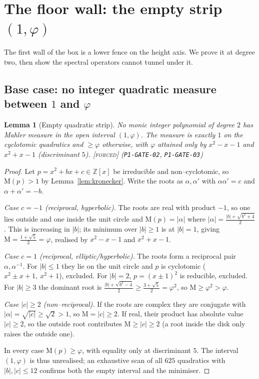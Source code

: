 \documentclass[11pt]{article}
\theoremstyle{plain}
\newtheorem{lemma}[theorem]{Lemma}
\theoremstyle{definition}
\theoremstyle{remark}
\newcommand{\forced}{\textcolor{forcedc}{\textsc{[forced]}}}
\newcommand{\Z}{\mathbb{Z}}
\newcommand{\Mah}{\mathrm{M}}
\newcommand{\abs}[1]{\left\lvert #1 \right\rvert}
\begin{document}
\section{The floor wall: the empty strip \texorpdfstring{$(1,\varphi)$}{(1,phi)}}\label{sec:floor}

The first wall of the box is a lower fence on the height axis. We prove it at degree two, then show the spectral operators cannot tunnel under it.

\subsection{Base case: no integer quadratic measure between \texorpdfstring{$1$}{1} and \texorpdfstring{$\varphi$}{phi}}
\begin{lemma}[Empty quadratic strip]\label{lem:base}
No monic integer polynomial of degree $2$ has Mahler measure in the open interval $(1,\varphi)$. The measure is exactly $1$ on the cyclotomic quadratics and $\ge\varphi$ otherwise, with $\varphi$ attained only by $x^2-x-1$ and $x^2+x-1$ (discriminant $5$). \forced{} {\small(\texttt{P1-GATE-02}, \texttt{P1-GATE-03})}
\end{lemma}
\begin{proof}
Let $p=x^2+bx+c\in\Z[x]$ be irreducible and non--cyclotomic, so $\Mah(p)>1$ by Lemma~\ref{lem:kronecker}. Write the roots as $\alpha,\alpha'$ with $\alpha\alpha'=c$ and $\alpha+\alpha'=-b$.

\emph{Case $c=-1$ (reciprocal, hyperbolic).} The roots are real with product $-1$, so one lies outside and one inside the unit circle and $\Mah(p)=\abs\alpha$ where $\abs\alpha=\tfrac{\abs b+\sqrt{b^2+4}}2$. This is increasing in $\abs b$; its minimum over $\abs b\ge1$ is at $\abs b=1$, giving $\Mah=\tfrac{1+\sqrt5}2=\varphi$, realised by $x^2-x-1$ and $x^2+x-1$.

\emph{Case $c=1$ (reciprocal, elliptic/hyperbolic).} The roots form a reciprocal pair $\alpha,\alpha^{-1}$. For $\abs b\le1$ they lie on the unit circle and $p$ is cyclotomic ($x^2\pm x+1,\ x^2+1$), excluded. For $\abs b=2$, $p=(x\pm1)^2$ is reducible, excluded. For $\abs b\ge3$ the dominant root is $\tfrac{\abs b+\sqrt{b^2-4}}2\ge\tfrac{3+\sqrt5}2=\varphi^2$, so $\Mah\ge\varphi^2>\varphi$.

\emph{Case $\abs c\ge2$ (non--reciprocal).} If the roots are complex they are conjugate with $\abs\alpha=\sqrt{\abs c}\ge\sqrt2>1$, so $\Mah=\abs c\ge2$. If real, their product has absolute value $\abs c\ge2$, so the outside root contributes $\Mah\ge\abs c\ge2$ (a root inside the disk only raises the outside one).

In every case $\Mah(p)\ge\varphi$, with equality only at discriminant $5$. The interval $(1,\varphi)$ is thus unrealised; an exhaustive scan of all $625$ quadratics with $\abs b,\abs c\le12$ confirms both the empty interval and the minimiser.
\end{proof}
\end{document}
